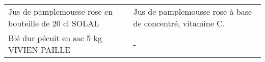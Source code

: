 \begin{longtable}{p{5cm}p{10cm}}
                                                     Jus de pamplemousse rose en bouteille de 20 cl SOLAL &                                                                                                                                                                                                                                                                                                                                                                                                                                                                                                                                                                                                                                                                                                                                                                                                                                                                                                                                                                                Jus de pamplemousse rose à base de concentré, vitamine C. \\
                                                                 Blé dur pécuit en sac 5 kg VIVIEN PAILLE &                                                                                                                                                                                                                                                                                                                                                                                                                                                                                                                                                                                                                                                                                                                                                                                                                                                                                                                                                                                                                                        - \\

\end{longtable}
